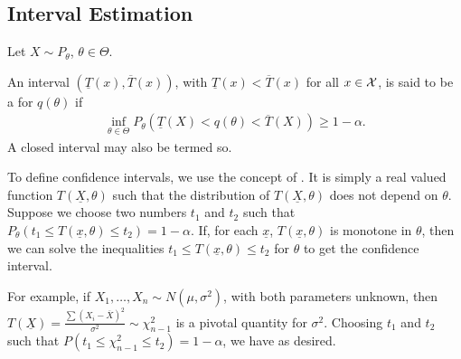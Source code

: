 \subsection{Interval Estimation}

Let $X \sim P_{\theta}$, $\theta \in \Theta$.

\begin{definition}
    An interval $(\underline{T}(x),\overline{T}(x))$, with $\underline{T}(x) < \overline{T}(x)$ for all $x \in \mathcal{X}$, is said to be a  for $q(\theta)$ if
    \begin{align}
        \inf_{\theta \in \Theta} P_{\theta}(\underline{T}(X) < q(\theta) < \overline{T}(X)) \geq 1 - \alpha.
    \end{align}
    A closed interval may also be termed so.
\end{definition}

To define confidence intervals, we use the concept of . It is simply a real valued function $T(\underline{X},\theta)$ such that the distribution of $T(\underline{X},\theta)$ does not depend on $\theta$. Suppose we choose two numbers $t_{1}$ and $t_{2}$ such that $P_{\theta}(t_{1} \leq T(\underline{x},\theta) \leq t_{2}) = 1-\alpha$. If, for each $\underline{x}$, $T(\underline{x},\theta)$ is monotone in $\theta$, then we can solve the inequalities $t_{1} \leq T(\underline{x},\theta) \leq t_{2}$ for $\theta$ to get the confidence interval.


For example, if $X_{1},\ldots,X_{n} \sim N(\mu,\sigma^{2})$, with both parameters unknown, then $T(\underline{X}) = \frac{\sum (X_{i}-\overline{X})^{2}}{\sigma^{2}} \sim \chi^{2}_{n-1}$ is a pivotal quantity for $\sigma^{2}$. Choosing $t_{1}$ and $t_{2}$ such that $P(t_{1} \leq \chi^{2}_{n-1} \leq t_{2}) = 1-\alpha$, we have as desired.